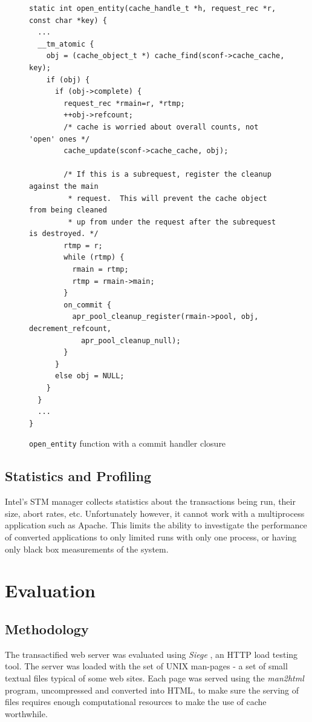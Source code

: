 \documentclass[preprint,11pt]{sigplanconf}
\let \cite = \citep
\begin{document}
\begin{figure}
\begin{lstlisting}
static int open_entity(cache_handle_t *h, request_rec *r, const char *key) {
  ...
  __tm_atomic {
    obj = (cache_object_t *) cache_find(sconf->cache_cache, key);
    if (obj) {
      if (obj->complete) {
        request_rec *rmain=r, *rtmp;
        ++obj->refcount;
        /* cache is worried about overall counts, not 'open' ones */
        cache_update(sconf->cache_cache, obj);

        /* If this is a subrequest, register the cleanup against the main
         * request.  This will prevent the cache object from being cleaned
         * up from under the request after the subrequest is destroyed. */
        rtmp = r;
        while (rtmp) {
          rmain = rtmp;
          rtmp = rmain->main;
        }
        on_commit {
          apr_pool_cleanup_register(rmain->pool, obj, decrement_refcount, 
            apr_pool_cleanup_null);
        }
      }
      else obj = NULL;
    }
  }
  ...
}
\end{lstlisting}
\caption{{\tt open\_entity} function with a commit handler closure}
\label{code:closure-open-entity}
\end{figure}


\subsection{Statistics and Profiling}\label{sec:wishlist-statistics}
Intel's STM manager collects statistics about the transactions being run, their
size, abort rates, etc. Unfortunately however, it cannot work with a
multiprocess application such as Apache. This limits the ability to investigate
the performance of converted applications to only limited runs with only one
process, or having only black box measurements of the system.

\section{Evaluation}\label{sec:evaluation}
\subsection{Methodology} 
The transactified web server was evaluated using \emph{Siege} \cite{siege}, an
HTTP load testing tool. The server was loaded with the set of UNIX man-pages - a
set of small textual files typical of some web sites. Each page was served using
the \emph{man2html} program, uncompressed and converted into HTML, to make sure
the serving of files requires enough computational resources to make the use of
cache worthwhile.
\end{document}
